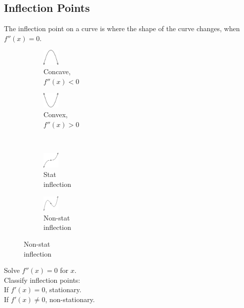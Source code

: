 \documentclass[10pt, a4paper, titlepage]{article}
\begin{document}
\begin{multicols*}{3}
	\dotfill
	\subsection{Inflection Points}
	The inflection point on a curve is where the shape of the curve changes, when $f''(x)=0$.
	\begin{figure}[H]
		\centering
		\begin{subfigure}[b]{0.1\textwidth}
			\centering
			\includegraphics[width=0.8cm]{concave.png}
			\caption*{Concave,\\$f''(x)<0$}
		\end{subfigure}
		\hfill
		\begin{subfigure}[b]{0.1\textwidth}
			\centering
			\includegraphics[width=0.8cm]{convex.png}
			\caption*{Convex,\\$f''(x)>0$}
		\end{subfigure}
		\\
		\centering
		\begin{subfigure}[b]{0.1\textwidth}
			\centering
			\includegraphics[width=0.8cm]{stat_inflection.png}
			\caption*{Stat\\inflection}
		\end{subfigure}
		\hfill
		\begin{subfigure}[b]{0.1\textwidth}
			\centering
			\includegraphics[width=0.8cm]{non_stat_inflection.png}
			\caption*{Non-stat\\inflection}
		\end{subfigure}
	\end{figure}
	Solve $f''(x)=0$ for $x$.\\
	Classify inflection points:\\
	If $f'(x)=0$, stationary.\\
	If $f'(x)\neq 0$, non-stationary.\\

	\dotfill

\end{multicols*}
\end{document}
